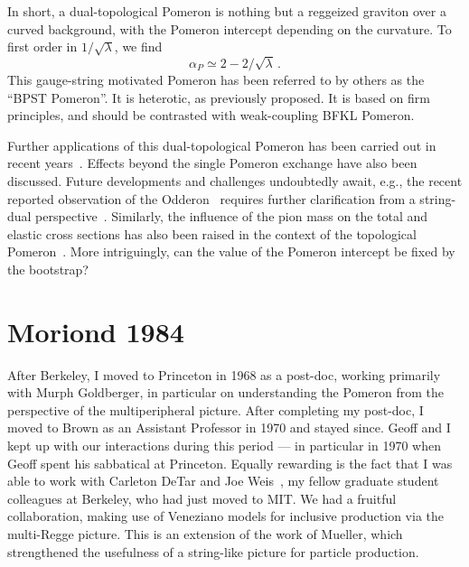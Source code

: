 \documentclass[11pt, oneside]{article}   	%
\newcommand{\<}{\langle}
\renewcommand{\>}{\rangle}
\numberwithin{equation}{section}
\numberwithin{figure}{section}
\begin{document}
 In short, a dual-topological Pomeron is nothing but a reggeized graviton over a curved background, with the Pomeron intercept depending on the curvature.  To first order in $1/\sqrt \lambda$,  we find
$$
\alpha_P\simeq 2-2/\sqrt \lambda \,.
$$
This gauge-string motivated Pomeron has been referred to by others as the ``BPST Pomeron''. It is  heterotic,  as previously proposed. It is based on  firm principles, and should  be contrasted with weak-coupling BFKL Pomeron. 

Further applications of this dual-topological  Pomeron has been carried out in recent years~\cite{Brower:2010wf}. Effects beyond the single Pomeron exchange have also been  discussed\cite{Brower:2007xg}. Future developments and challenges undoubtedly await, e.g., the recent reported observation of the Odderon~\cite{Martynov:2018yas}  requires further clarification from a string-dual perspective~\cite{Brower:2014wha}. Similarly, the influence of the pion mass on the total and elastic cross sections has also been raised in the context of the topological Pomeron~\cite{Tan:1710.10594}. More intriguingly, can the value of the Pomeron intercept be fixed by the bootstrap? 

\section{Moriond 1984}

After Berkeley, I  moved to Princeton in 1968 as  a post-doc, working primarily with Murph Goldberger, in particular on understanding the Pomeron from the perspective of the multiperipheral picture. After completing my post-doc, I moved to Brown as an Assistant Professor in 1970 and stayed since. Geoff and I kept up with our interactions during this period --- in particular in  1970 when Geoff spent his sabbatical at Princeton.   Equally rewarding  is the fact that I was able to work with Carleton DeTar and Joe Weis~\cite{Detar:1971dj}, my fellow graduate student colleagues at Berkeley, who had just moved to MIT. We had a fruitful collaboration, making use of Veneziano models for inclusive production via the multi-Regge picture. This is an extension of the work of Mueller, which strengthened the usefulness of a string-like picture for particle production.
\end{document}
